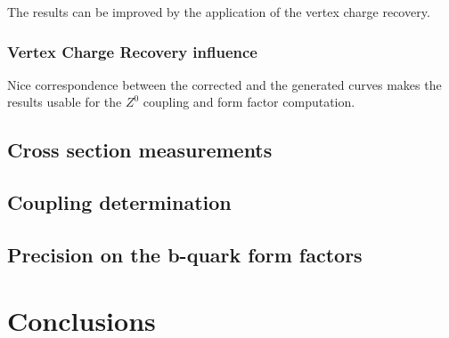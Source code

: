 The results can be improved by the application of the vertex charge recovery. 
\subsubsection{Vertex Charge Recovery influence}

Nice correspondence between the corrected and the generated curves makes the results usable for the $Z^0$ coupling and form factor computation.
\subsection{Cross section measurements}
\subsection{Coupling determination}
\subsection{Precision on the b-quark form factors}
\section*{Conclusions}
